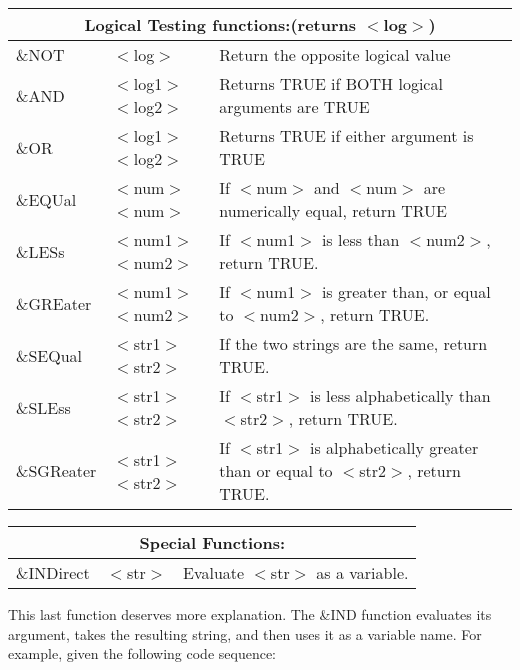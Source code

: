 \begin{tabular}{p{.8in}p{1.7in}p{250pt}}
\multicolumn{3}{c}{Logical Testing functions:(returns
$<${}log$>${})}\\ \hline

\&NOT & $<${}log$>${} & Return the opposite logical value\\

\&AND & $<${}log1$>${} $<${}log2$>${} & Returns TRUE if BOTH logical
arguments are TRUE\\

\&OR & $<${}log1$>${} $<${}log2$>${} & Returns TRUE if either argument
is TRUE\\

\&EQUal & $<${}num$>${} $<${}num$>${} & If $<${}num$>${} and
$<${}num$>${} are numerically equal, return TRUE\\

\&LESs & $<${}num1$>${} $<${}num2$>${} & If $<${}num1$>${} is less
than $<${}num2$>${}, return TRUE.\\

\&GREater & $<${}num1$>${} $<${}num2$>${} & If $<${}num1$>${} is
greater than, or equal to $<${}num2$>${}, return TRUE.\\

\&SEQual & $<${}str1$>${} $<${}str2$>${} & If the two strings are the
same, return TRUE.\\

\&SLEss & $<${}str1$>${} $<${}str2$>${} & If $<${}str1$>${} is less
alphabetically than $<${}str2$>${}, return TRUE.\\

\&SGReater & $<${}str1$>${} $<${}str2$>${} & If $<${}str1$>${} is
alphabetically greater than or equal to $<${}str2$>${}, return TRUE.\\

\end{tabular}

\begin{tabular}{p{.8in}p{1.7in}p{250pt}}
\multicolumn{3}{c}{Special Functions:}\\ \hline

\&INDirect & $<${}str$>${} & Evaluate $<${}str$>${} as a variable.\\

\end{tabular}

This last function deserves more explanation. The \&IND function
evaluates its argument, takes the resulting string, and then uses it as
a variable name.  For example, given the following code sequence:

